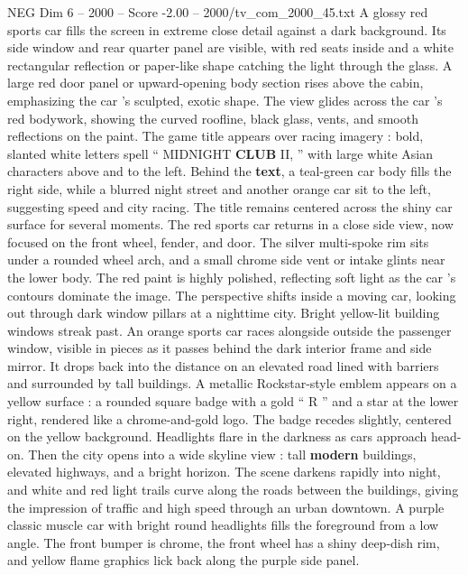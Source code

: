\begin{textsample}{NEG Dim 6 – 2000 – Score -2.00 – 2000/tv\_com\_2000\_45.txt}  \label{ex:f6_neg_045}
A glossy red sports car fills the screen in extreme close detail against a dark background.
Its side window and rear quarter panel are visible, with red seats inside and a white rectangular reflection or paper-like shape catching the light through the glass.
A large red door panel or upward-opening body section rises above the cabin, emphasizing the car ’s sculpted, exotic shape.
The view glides across the car ’s red bodywork, showing the curved roofline, black glass, vents, and smooth reflections on the paint.
The game title appears over racing imagery : bold, slanted white letters spell “ MIDNIGHT \textbf{CLUB} II, ” with large white Asian characters above and to the left.
Behind the \textbf{text}, a teal-green car body fills the right side, while a blurred night street and another orange car sit to the left, suggesting speed and city racing.
The title remains centered across the shiny car surface for several moments.
The red sports car returns in a close side view, now focused on the front wheel, fender, and door.
The silver multi-spoke rim sits under a rounded wheel arch, and a small chrome side vent or intake glints near the lower body.
The red paint is highly polished, reflecting soft light as the car ’s contours dominate the image.
The perspective shifts inside a moving car, looking out through dark window pillars at a nighttime city.
Bright yellow-lit building windows streak past.
An orange sports car races alongside outside the passenger window, visible in pieces as it passes behind the dark interior frame and side mirror.
It drops back into the distance on an elevated road lined with barriers and surrounded by tall buildings.
A metallic Rockstar-style emblem appears on a yellow surface : a rounded square badge with a gold “ R ” and a star at the lower right, rendered like a chrome-and-gold logo.
The badge recedes slightly, centered on the yellow background.
Headlights flare in the darkness as cars approach head-on.
Then the city opens into a wide skyline view : tall \textbf{modern} buildings, elevated highways, and a bright horizon.
The scene darkens rapidly into night, and white and red light trails curve along the roads between the buildings, giving the impression of traffic and high speed through an urban downtown.
A purple classic muscle car with bright round headlights fills the foreground from a low angle.
The front bumper is chrome, the front wheel has a shiny deep-dish rim, and yellow flame graphics lick back along the purple side panel.

\end{textsample}
